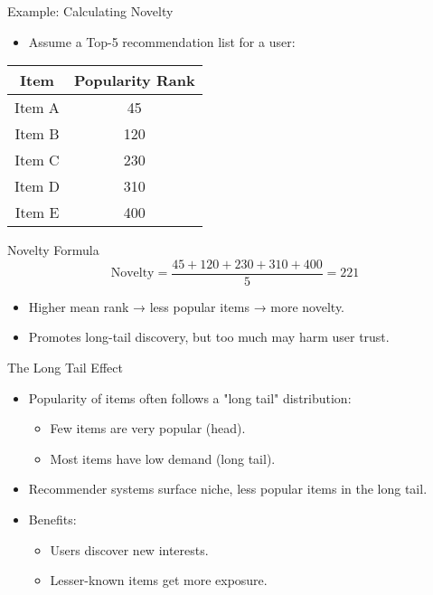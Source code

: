 \documentclass{beamer}
\begin{document}
\begin{frame}{Example: Calculating Novelty}
\begin{itemize}
    \item Assume a Top-5 recommendation list for a user:
\end{itemize}

\begin{center}
\begin{tabular}{|c|c|}
\hline
\textbf{Item} & \textbf{Popularity Rank} \\ \hline
Item A & 45 \\ \hline
Item B & 120 \\ \hline
Item C & 230 \\ \hline
Item D & 310 \\ \hline
Item E & 400 \\ \hline
\end{tabular}
\end{center}

\begin{block}{Novelty Formula}
\[
\text{Novelty} = \frac{45 + 120 + 230 + 310 + 400}{5} = 221
\]
\end{block}

\begin{itemize}
    \item Higher mean rank → less popular items → more novelty.
    \item Promotes long-tail discovery, but too much may harm user trust.
\end{itemize}
\end{frame}


\begin{frame}{The Long Tail Effect}
\begin{itemize}
    \item Popularity of items often follows a "long tail" distribution:
    \begin{itemize}
        \item Few items are very popular (head).
        \item Most items have low demand (long tail).
    \end{itemize}
    \item Recommender systems surface niche, less popular items in the long tail.
    \item Benefits:
    \begin{itemize}
        \item Users discover new interests.
        \item Lesser-known items get more exposure.
    \end{itemize}
\end{itemize}
\end{frame}
\end{document}
